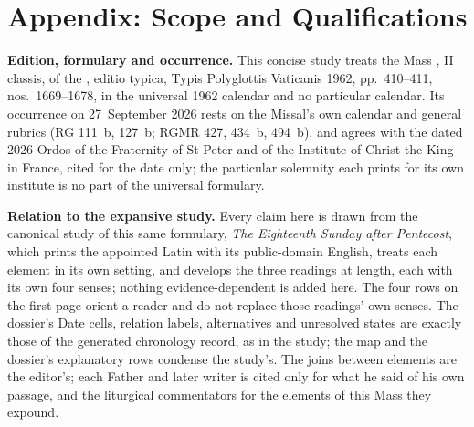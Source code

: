 
\section{Appendix: Scope and Qualifications}

{\footnotesize
\textbf{Edition, formulary and occurrence.} This concise study treats the Mass
, II classis, of the
, editio typica, Typis Polyglottis Vaticanis 1962,
pp.~410--411, nos.~1669--1678, in the universal 1962 calendar and no particular
calendar. Its occurrence on 27~September 2026 rests on the Missal's own calendar
and general rubrics (RG 111~b, 127~b; RGMR 427, 434~b, 494~b), and agrees with
the dated 2026 Ordos of the Fraternity of St Peter and of the Institute of
Christ the King in France, cited for the date only; the particular solemnity
each prints for its own institute is no part of the universal formulary.

\textbf{Relation to the expansive study.} Every claim here is drawn from the
canonical study of this same formulary, \textit{The Eighteenth Sunday after
Pentecost}, which prints the appointed Latin with its public-domain English,
treats each element in its own setting, and develops the three readings at
length, each with its own four senses; nothing evidence-dependent is added here.
The four rows on the first page orient a reader and do not replace those
readings' own senses. The dossier's Date cells, relation labels, alternatives
and unresolved states are exactly those of the generated chronology record, as
in the study; the map and the dossier's explanatory rows condense the study's. The joins between elements are the
editor's; each Father and later writer is cited only for what he said of his
own passage, and the liturgical commentators for the elements of this Mass
they expound.

}
